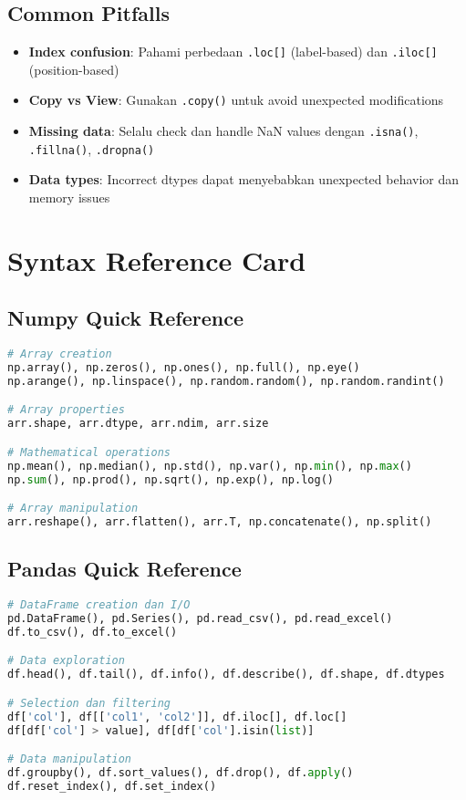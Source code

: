 \subsection*{Common Pitfalls}
\begin{itemize}
  \item \textbf{Index confusion}: Pahami perbedaan \texttt{.loc[]} (label-based) dan \texttt{.iloc[]} (position-based)
  \item \textbf{Copy vs View}: Gunakan \texttt{.copy()} untuk avoid unexpected modifications
  \item \textbf{Missing data}: Selalu check dan handle NaN values dengan \texttt{.isna()}, \texttt{.fillna()}, \texttt{.dropna()}
  \item \textbf{Data types}: Incorrect dtypes dapat menyebabkan unexpected behavior dan memory issues
\end{itemize}

\section*{Syntax Reference Card}

\subsection*{Numpy Quick Reference}
\begin{lstlisting}[language=python, style=python]
# Array creation
np.array(), np.zeros(), np.ones(), np.full(), np.eye()
np.arange(), np.linspace(), np.random.random(), np.random.randint()

# Array properties
arr.shape, arr.dtype, arr.ndim, arr.size

# Mathematical operations
np.mean(), np.median(), np.std(), np.var(), np.min(), np.max()
np.sum(), np.prod(), np.sqrt(), np.exp(), np.log()

# Array manipulation
arr.reshape(), arr.flatten(), arr.T, np.concatenate(), np.split()
\end{lstlisting}

\subsection*{Pandas Quick Reference}
\begin{lstlisting}[language=python, style=python]
# DataFrame creation dan I/O
pd.DataFrame(), pd.Series(), pd.read_csv(), pd.read_excel()
df.to_csv(), df.to_excel()

# Data exploration
df.head(), df.tail(), df.info(), df.describe(), df.shape, df.dtypes

# Selection dan filtering
df['col'], df[['col1', 'col2']], df.iloc[], df.loc[]
df[df['col'] > value], df[df['col'].isin(list)]

# Data manipulation
df.groupby(), df.sort_values(), df.drop(), df.apply()
df.reset_index(), df.set_index()
\end{lstlisting}

